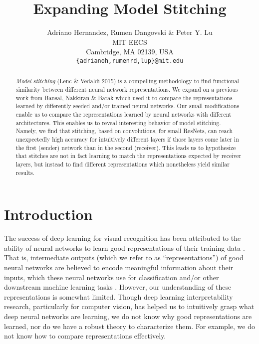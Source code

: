 \documentclass{article} %
\title{Expanding Model Stitching}
\author{Adriano Hernandez, Rumen Dangovski \& Peter Y. Lu\\
MIT EECS\\
Cambridge, MA 02139, USA \\
\texttt{\{adrianoh,rumenrd,lup\}@mit.edu}
}
\begin{document}
\maketitle

\begin{abstract}
\textit{Model stitching} (Lenc \& Vedaldi 2015) is a compelling methodology to find functional
similarity between different neural network representations.
We expand on a previous work from Bansal, Nakkiran \& Barak which used it to
compare the representations learned by differently seeded
and/or trained neural networks.
Our small modifications enable us to compare the representations learned by neural networks with different architectures.
This enables us to reveal interesting behavior of model stitching. Namely, we find that stitching, 
based on convolutions, for small ResNets, can reach unexpectedly
high accuracy for intuitively different layers if those layers come later in the first (sender) network than in
the second (receiver). This leads us to hypothesize that stitches are not in fact learning to match the
representations expected by receiver layers, but instead to find different representations which nonetheless
yield similar results.
\end{abstract}

\section{Introduction}
\label{Introduction}
The success of deep learning for visual recognition has been attributed to the ability of neural networks to learn
good representations of their training data \cite{Rumelhart1986LearningIR}. That is, intermediate outputs (which we refer
to as ``representations'') of good neural networks 
are believed to encode meaningful information about their inputs, which these neural networks use for classification and/or other
downstream machine learning tasks \cite{goodfellow2016deep}.
However, our understanding of these representations is somewhat limited. Though
deep learning interpretability research, particularly for computer vision, has helped us
to intuitively grasp what deep neural 
networks are learning, we do not
know why good representations are learned, nor do we have a robust theory to characterize them. For example, we do not
know how to compare representations effectively.
\end{document}
